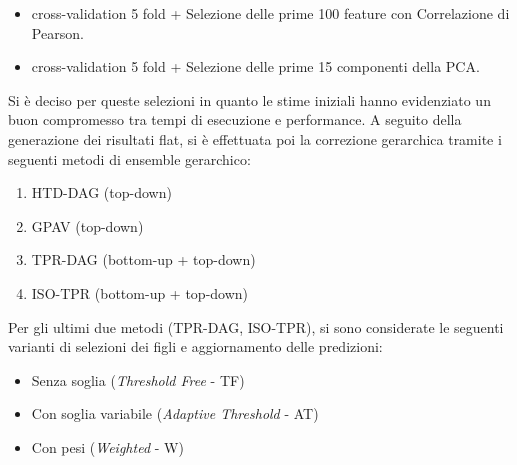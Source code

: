 \documentclass[12pt]{report}
\begin{document}
\begin{itemize}
\item cross-validation 5 fold + Selezione delle prime 100 feature con Correlazione di Pearson.
\item cross-validation 5 fold + Selezione delle prime 15 componenti della PCA.
\end{itemize} 
Si è deciso per queste selezioni in quanto le stime iniziali hanno evidenziato un buon compromesso tra tempi di esecuzione e performance.  
\newline
\newline
A seguito della generazione dei risultati flat, si è effettuata poi la correzione gerarchica tramite i seguenti metodi di ensemble gerarchico:

\begin{enumerate}
\item HTD-DAG (top-down)
\item GPAV (top-down)
\item TPR-DAG (bottom-up + top-down)
\item ISO-TPR (bottom-up + top-down)
\end{enumerate}

Per gli ultimi due metodi (TPR-DAG, ISO-TPR), si sono considerate le seguenti varianti di selezioni dei figli e aggiornamento delle predizioni:
\begin{itemize}
\item Senza soglia (\emph{Threshold Free} - TF)
\item Con soglia variabile (\emph{Adaptive Threshold} - AT)
\item Con pesi (\emph{Weighted} - W)
\end{itemize}
\end{document}
